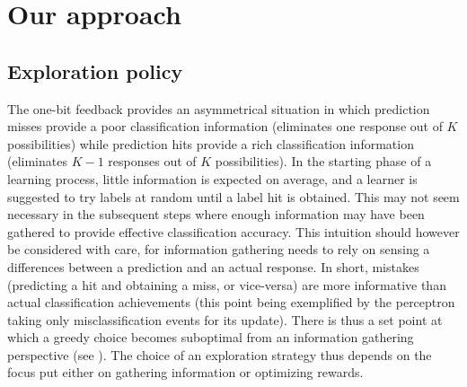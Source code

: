 \documentclass[preprint,12pt,authoryear]{elsarticle}
\begin{document}












\section{Our approach}

\subsection{Exploration policy}

The one-bit feedback provides an asymmetrical situation in which prediction misses provide a poor classification information (eliminates one response out of $K$ possibilities) while prediction hits provide a rich classification information (eliminates $K-1$ responses out of $K$ possibilities). 
In the starting phase of a learning process, little information is expected on average, and a learner is suggested to try labels at random until a label hit is obtained. This may not seem necessary in the subsequent steps where enough information may have been gathered to provide effective classification accuracy. 
This intuition should however be considered with care, for information gathering needs to rely on sensing a differences between a prediction and an actual response. 
In short, mistakes (predicting a hit and obtaining a miss, or vice-versa) are  more informative than actual classification achievements (this point being exemplified by the perceptron taking only misclassification events for its update). There is thus a set point at which a greedy choice becomes suboptimal from an information gathering perspective (see \cite{kakade2008efficient}).
The choice of an exploration strategy thus depends on the focus put either on gathering information or optimizing rewards. 
\end{document}
